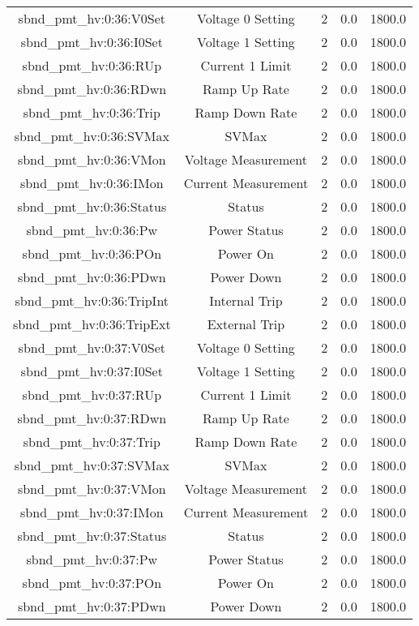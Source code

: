 \begin{center}
\begin{longtable}{c | c c c c }
sbnd\_pmt\_hv:0:36:V0Set & Voltage 0 Setting & 2 & 0.0 & 1800.0\\ 
sbnd\_pmt\_hv:0:36:I0Set & Voltage 1 Setting & 2 & 0.0 & 1800.0\\ 
sbnd\_pmt\_hv:0:36:RUp & Current 1 Limit & 2 & 0.0 & 1800.0\\ 
sbnd\_pmt\_hv:0:36:RDwn & Ramp Up Rate & 2 & 0.0 & 1800.0\\ 
sbnd\_pmt\_hv:0:36:Trip & Ramp Down Rate & 2 & 0.0 & 1800.0\\ 
sbnd\_pmt\_hv:0:36:SVMax & SVMax & 2 & 0.0 & 1800.0\\ 
sbnd\_pmt\_hv:0:36:VMon & Voltage Measurement & 2 & 0.0 & 1800.0\\ 
sbnd\_pmt\_hv:0:36:IMon & Current Measurement & 2 & 0.0 & 1800.0\\ 
sbnd\_pmt\_hv:0:36:Status & Status & 2 & 0.0 & 1800.0\\ 
sbnd\_pmt\_hv:0:36:Pw & Power Status & 2 & 0.0 & 1800.0\\ 
sbnd\_pmt\_hv:0:36:POn & Power On & 2 & 0.0 & 1800.0\\ 
sbnd\_pmt\_hv:0:36:PDwn & Power Down & 2 & 0.0 & 1800.0\\ 
sbnd\_pmt\_hv:0:36:TripInt & Internal Trip & 2 & 0.0 & 1800.0\\ 
sbnd\_pmt\_hv:0:36:TripExt & External Trip & 2 & 0.0 & 1800.0\\ 
sbnd\_pmt\_hv:0:37:V0Set & Voltage 0 Setting & 2 & 0.0 & 1800.0\\ 
sbnd\_pmt\_hv:0:37:I0Set & Voltage 1 Setting & 2 & 0.0 & 1800.0\\ 
sbnd\_pmt\_hv:0:37:RUp & Current 1 Limit & 2 & 0.0 & 1800.0\\ 
sbnd\_pmt\_hv:0:37:RDwn & Ramp Up Rate & 2 & 0.0 & 1800.0\\ 
sbnd\_pmt\_hv:0:37:Trip & Ramp Down Rate & 2 & 0.0 & 1800.0\\ 
sbnd\_pmt\_hv:0:37:SVMax & SVMax & 2 & 0.0 & 1800.0\\ 
sbnd\_pmt\_hv:0:37:VMon & Voltage Measurement & 2 & 0.0 & 1800.0\\ 
sbnd\_pmt\_hv:0:37:IMon & Current Measurement & 2 & 0.0 & 1800.0\\ 
sbnd\_pmt\_hv:0:37:Status & Status & 2 & 0.0 & 1800.0\\ 
sbnd\_pmt\_hv:0:37:Pw & Power Status & 2 & 0.0 & 1800.0\\ 
sbnd\_pmt\_hv:0:37:POn & Power On & 2 & 0.0 & 1800.0\\ 
sbnd\_pmt\_hv:0:37:PDwn & Power Down & 2 & 0.0 & 1800.0\\ 

\end{longtable}
\end{center}
